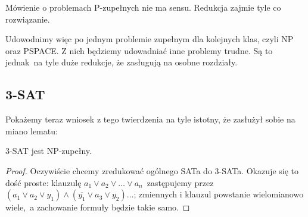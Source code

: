 \begin{corollary}
	Mówienie o problemach P-zupełnych nie ma sensu. Redukcja zajmie tyle co rozwiązanie.
\end{corollary}

Udowodnimy więc po jednym problemie zupełnym dla kolejnych klas, czyli NP oraz PSPACE. Z nich będziemy udowadniać inne problemy trudne. Są to jednak\
na tyle duże redukcje, że zasługują na osobne rozdziały.



\subsection{3-SAT}

Pokażemy teraz wniosek z tego twierdzenia na tyle istotny, że zasłużył sobie na miano lematu:

\begin{lemma}
	3-SAT jest NP-zupełny.
\end{lemma}

\begin{proof}
	Oczywiście chcemy zredukować ogólnego SATa do 3-SATa. Okazuje się to dość proste: klauzulę \(a_1 \vee a_2 \vee \dotsc \vee a_n \)\
	zastępujemy przez \((a_1 \vee a_2 \vee y_1) \wedge (\overline{y_1} \vee a_3 \vee y_2) \dotsc \); zmiennych i klauzul powstanie wielomianowo wiele,\
	a zachowanie formuły będzie takie samo.
\end{proof}


